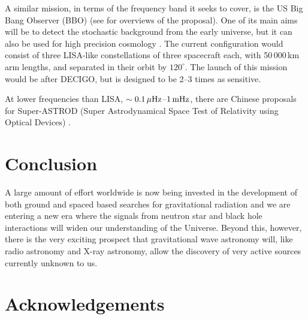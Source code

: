 \documentclass{article}
\begin{document}
A similar mission, in terms of the frequency band it seeks to cover, is the US
Big Bang Observer (BBO) (see \cite{Crowder:2005, Cutler:2009, Harry:2006} for
overviews of the proposal). One of its main aims will be to detect the
stochastic background from the early universe, but it can also be used for high
precision cosmology \cite{Cutler:2009}. The current configuration would consist
of three LISA-like constellations of three spacecraft each, with 50\,000\,km arm
lengths, and separated in their orbit by $120^{\circ}$. The launch of this
mission would be after DECIGO, but is designed to be 2--3 times as sensitive.

At lower frequencies than LISA, $\sim0.1\,\mu{\rm Hz}$--$1\,{\rm mHz}$, there
are Chinese proposals for Super-ASTROD (Super Astrodynamical Space Test of
Relativity using Optical Devices) \cite{Ni:2009}.


\newpage

\section{Conclusion}
\label{section:conclusion}

A large amount of effort worldwide is now being invested in the development of
both ground and spaced based searches for gravitational radiation and we are
entering a new era where the signals from neutron star and black hole
interactions will widen our understanding of the Universe. Beyond this, however,
there is the very exciting prospect that gravitational wave astronomy will, like
radio astronomy and X-ray astronomy, allow the discovery of very active sources
currently unknown to us.




\newpage

\section{Acknowledgements}
\label{section:acknowledgements}
\end{document}

